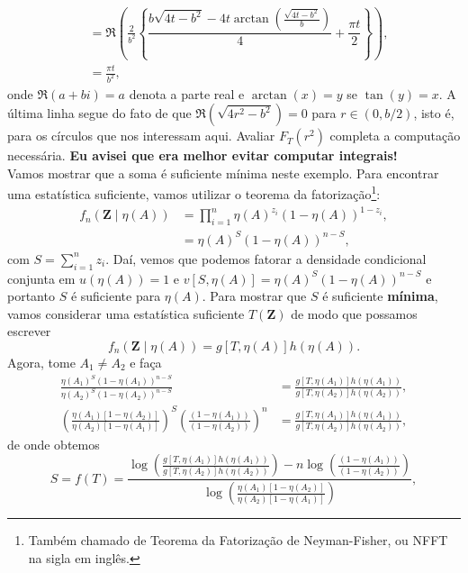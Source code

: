 \documentclass[a4paper,10pt, notitlepage]{report}
\begin{document}
{\begin{align*}
 &= \Re \left(\frac{2}{b^2} \left\{ \dfrac{b\sqrt{4t-b^2}-4t\arctan\left(\frac{\sqrt{4t-b^2}}{b}\right)}{4}+\dfrac{{\pi}t}{2} \right\} \right),\\
 &= \frac{\pi t}{b^2},
\end{align*}
onde $\Re(a + bi)= a$ denota a parte real e $\arctan(x) = y$ se $\tan(y) = x$.
A última linha segue do fato de que $\Re(\sqrt{4r^2-b^2}) = 0$ para $r \in (0, b/2)$, isto é, para os círculos que nos interessam aqui.
Avaliar $F_T(r^2)$ completa a computação necessária.
\textbf{Eu avisei que era melhor evitar computar integrais!}
\\
Vamos mostrar que a soma é suficiente mínima neste exemplo.
Para encontrar uma estatística suficiente, vamos utilizar o teorema da fatorização\footnote{Também chamado de Teorema da Fatorização de Neyman-Fisher, ou NFFT na sigla em inglês.}:
\begin{align*}
f_n\left(\boldsymbol{Z} \mid \eta(A)\right) &= \prod_{i=1}^n \eta(A)^{z_i} \left(1-\eta(A)\right)^{1-z_i},\\
&= \eta(A)^S \left(1-\eta(A)\right)^{n-S},
\end{align*}
com $S = \sum_{i=1}^n z_i$.
Daí, vemos que podemos fatorar a densidade condicional conjunta em $u(\eta(A)) = 1 $ e $v[S, \eta(A)] = \eta(A)^S \left(1-\eta(A)\right)^{n-S}$  e portanto $S$ é suficiente para $\eta(A)$.
Para mostrar que $S$ é suficiente \textbf{mínima}, vamos considerar uma estatística suficiente $T(\boldsymbol{Z})$ de modo que possamos escrever
$$
f_n\left(\boldsymbol{Z} \mid \eta(A)\right) = g[T, \eta(A)]h(\eta(A)).
$$
Agora, tome $A_1 \neq A_2$ e faça
\begin{align*}
\frac{ \eta(A_1)^S \left(1-\eta(A_1)\right)^{n-S}}{ \eta(A_2)^S \left(1-\eta(A_2)\right)^{n-S}} &= \frac{g[T, \eta(A_1)]h(\eta(A_1))}{g[T, \eta(A_2)]h(\eta(A_2))},\\
\left(\frac{\eta(A_1)\left[1-\eta(A_2)\right]}{\eta(A_2)\left[1-\eta(A_1)\right]}\right)^S\left(\frac{\left(1-\eta(A_1)\right)}{\left(1-\eta(A_2)\right)}\right)^n &= \frac{g[T, \eta(A_1)]h(\eta(A_1))}{g[T, \eta(A_2)]h(\eta(A_2))},
\end{align*}
de onde obtemos
$$
S = f(T) =\frac{\log \left( \frac{g[T, \eta(A_1)]h(\eta(A_1))}{g[T, \eta(A_2)]h(\eta(A_2))}\right) - n\log \left(\frac{\left(1-\eta(A_1)\right)}{\left(1-\eta(A_2)\right)}\right)}{\log \left(\frac{\eta(A_1)\left[1-\eta(A_2)\right]}{\eta(A_2)\left[1-\eta(A_1)\right]}\right) },
$$}
\end{document}
